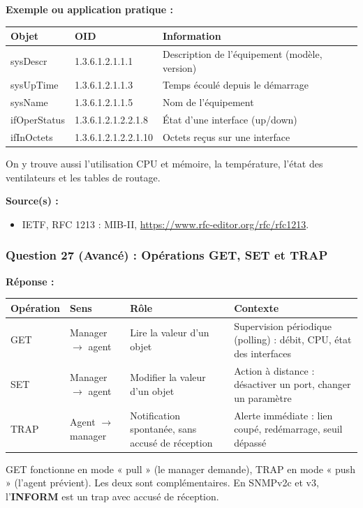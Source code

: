 \documentclass[12pt,a4paper]{article}
\newcommand{\reponse}{\textbf{Réponse :}\par}
\newcommand{\exemple}{\textbf{Exemple ou application pratique :}\par}
\newcommand{\sources}{\textbf{Source(s) :}}
\newcommand{\fl}{\ensuremath{\rightarrow}}
\begin{document}
\exemple
\begin{longtable}{|L{4cm}|L{4.6cm}|L{6cm}|}
\hline
\textbf{Objet} & \textbf{OID} & \textbf{Information} \\ \hline
sysDescr & 1.3.6.1.2.1.1.1 & Description de l'équipement (modèle,
version) \\ \hline
sysUpTime & 1.3.6.1.2.1.1.3 & Temps écoulé depuis le démarrage \\ \hline
sysName & 1.3.6.1.2.1.1.5 & Nom de l'équipement \\ \hline
ifOperStatus & 1.3.6.1.2.1.2.2.1.8 & État d'une interface (up/down) \\ \hline
ifInOctets & 1.3.6.1.2.1.2.2.1.10 & Octets reçus sur une interface \\ \hline
\end{longtable}
On y trouve aussi l'utilisation CPU et mémoire, la température, l'état
des ventilateurs et les tables de routage.

\sources
\begin{itemize}
    \item IETF, RFC 1213 : MIB-II,
    \url{https://www.rfc-editor.org/rfc/rfc1213}.
\end{itemize}

\subsubsection*{Question 27 (Avancé) : Opérations GET, SET et TRAP}

\reponse
\begin{longtable}{|L{1.8cm}|L{3.2cm}|L{4.8cm}|L{4.8cm}|}
\hline
\textbf{Opération} & \textbf{Sens} & \textbf{Rôle} & \textbf{Contexte} \\ \hline
\endhead
GET & Manager \fl{} agent & Lire la valeur d'un objet & Supervision
périodique (polling) : débit, CPU, état des interfaces \\ \hline
SET & Manager \fl{} agent & Modifier la valeur d'un objet & Action à
distance : désactiver un port, changer un paramètre \\ \hline
TRAP & Agent \fl{} manager & Notification spontanée, sans accusé de
réception & Alerte immédiate : lien coupé, redémarrage, seuil dépassé
\\ \hline
\end{longtable}

GET fonctionne en mode « pull » (le manager demande), TRAP en mode
« push » (l'agent prévient). Les deux sont complémentaires. En SNMPv2c
et v3, l'\textbf{INFORM} est un trap avec accusé de réception.
\end{document}
